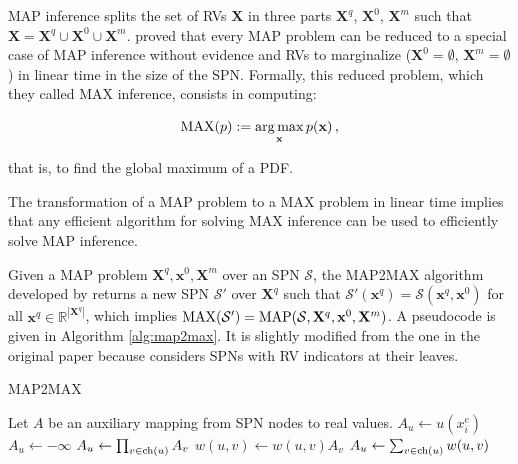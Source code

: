 MAP inference splits the set of RVs $\mathbf{X}$ in three parts $\mathbf{X}^q$, $\mathbf{X}^0$, $\mathbf{X}^m$ such that $\mathbf{X} = \mathbf{X}^q \cup \mathbf{X}^0 \cup \mathbf{X}^m$. \citet{Mei2017} proved that every MAP problem can be reduced to a special case of MAP inference without evidence and RVs to marginalize ($\mathbf{X}^0 = \emptyset$, $\mathbf{X}^m = \emptyset$) in linear time in the size of the SPN. Formally, this reduced problem, which they called MAX inference, consists in computing:

\begin{equation}
  \operatorname*{MAX}(p) := \operatorname*{arg\,max}_{\mathbf{x}} p(\textbf{x}) \, ,
\end{equation}

\noindent that is, to find the global maximum of a PDF.

The transformation of a MAP problem to a MAX problem in linear time implies that any efficient algorithm for solving MAX inference can be used to efficiently solve MAP inference.

Given a MAP problem $\mathbf{X}^q, \mathbf{x}^0, \mathbf{X}^m$ over an SPN $\mathcal{S}$, the MAP2MAX algorithm developed by \citet{Mei2017} returns a new SPN $\mathcal{S}'$ over $\mathbf{X}^q$ such that $\mathcal{S}'(\mathbf{x}^q) = \mathcal{S}(\mathbf{x}^q, \mathbf{x}^0)$ for all $\mathbf{x}^q \in \mathbb{R}^{|\mathbf{X}^q|}$, which implies $\operatorname*{MAX}(\mathcal{S}') = \operatorname*{MAP}(\mathcal{S}, \mathbf{X}^q, \mathbf{x}^0, \mathbf{X}^m)$. A pseudocode is given in Algorithm \ref{alg:map2max}. It is slightly modified from the one in the original paper because \citet{Mei2017} considers SPNs with RV indicators at their leaves.

\begin{algorithm}[h]
  \caption{MAP2MAX}
  \label{alg:map2max}
  \begin{algorithmic}
  \end{algorithmic}
  \begin{algorithmic}[1]
    \LineComment Let $A$ be an auxiliary mapping from SPN nodes to real values.
    \State $A_u \gets u(x^e_i)$
    \Else
    \State $A_u \gets -\infty$
    \EndIf
    \State $A_u \gets \prod_{v \in \operatorname*{ch}(u)} A_v$
    \State $w(u, v) \gets w(u, v) A_v$
    \EndFor
    \State $A_u \gets \sum_{v \in \operatorname*{ch}(u)} w(u, v)$
    \Else
    \EndIf
    \EndIf
    \EndFor
    \EndIf
    \EndFor
    \State {}
  \end{algorithmic}
\end{algorithm}

